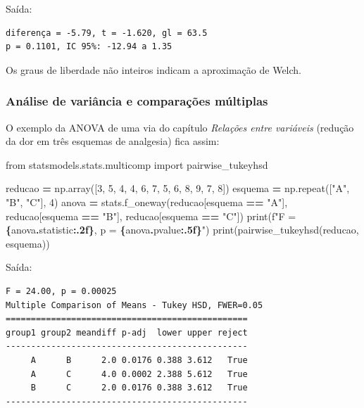 \documentclass[
]{book}
\newenvironment{Shaded}{\begin{snugshade}}{\end{snugshade}}
\newcommand{\BuiltInTok}[1]{#1}
\newcommand{\DecValTok}[1]{\textcolor[rgb]{0.00,0.00,0.81}{#1}}
\newcommand{\ImportTok}[1]{#1}
\newcommand{\NormalTok}[1]{#1}
\newcommand{\OperatorTok}[1]{\textcolor[rgb]{0.81,0.36,0.00}{\textbf{#1}}}
\newcommand{\SpecialCharTok}[1]{\textcolor[rgb]{0.81,0.36,0.00}{\textbf{#1}}}
\newcommand{\SpecialStringTok}[1]{\textcolor[rgb]{0.31,0.60,0.02}{#1}}
\newcommand{\StringTok}[1]{\textcolor[rgb]{0.31,0.60,0.02}{#1}}
\begin{document}
Saída:

\begin{verbatim}
diferença = -5.79, t = -1.620, gl = 63.5
p = 0.1101, IC 95%: -12.94 a 1.35
\end{verbatim}

Os graus de liberdade não inteiros indicam a aproximação de Welch.

\subsubsection{Análise de variância e comparações múltiplas}\label{anuxe1lise-de-variuxe2ncia-e-comparauxe7uxf5es-muxfaltiplas}

O exemplo da ANOVA de uma via do capítulo \emph{Relações entre variáveis} (redução da dor em três esquemas de analgesia) fica assim:

\begin{Shaded}
\begin{Highlighting}[]
\ImportTok{from}\NormalTok{ statsmodels.stats.multicomp }\ImportTok{import}\NormalTok{ pairwise\_tukeyhsd}

\NormalTok{reducao }\OperatorTok{=}\NormalTok{ np.array([}\DecValTok{3}\NormalTok{, }\DecValTok{5}\NormalTok{, }\DecValTok{4}\NormalTok{, }\DecValTok{4}\NormalTok{, }\DecValTok{6}\NormalTok{, }\DecValTok{7}\NormalTok{, }\DecValTok{5}\NormalTok{, }\DecValTok{6}\NormalTok{, }\DecValTok{8}\NormalTok{, }\DecValTok{9}\NormalTok{, }\DecValTok{7}\NormalTok{, }\DecValTok{8}\NormalTok{])}
\NormalTok{esquema }\OperatorTok{=}\NormalTok{ np.repeat([}\StringTok{"A"}\NormalTok{, }\StringTok{"B"}\NormalTok{, }\StringTok{"C"}\NormalTok{], }\DecValTok{4}\NormalTok{)}
\NormalTok{anova }\OperatorTok{=}\NormalTok{ stats.f\_oneway(reducao[esquema }\OperatorTok{==} \StringTok{"A"}\NormalTok{], reducao[esquema }\OperatorTok{==} \StringTok{"B"}\NormalTok{],}
\NormalTok{                       reducao[esquema }\OperatorTok{==} \StringTok{"C"}\NormalTok{])}
\BuiltInTok{print}\NormalTok{(}\SpecialStringTok{f"F = }\SpecialCharTok{\{}\NormalTok{anova}\SpecialCharTok{.}\NormalTok{statistic}\SpecialCharTok{:.2f\}}\SpecialStringTok{, p = }\SpecialCharTok{\{}\NormalTok{anova}\SpecialCharTok{.}\NormalTok{pvalue}\SpecialCharTok{:.5f\}}\SpecialStringTok{"}\NormalTok{)}
\BuiltInTok{print}\NormalTok{(pairwise\_tukeyhsd(reducao, esquema))}
\end{Highlighting}
\end{Shaded}

Saída:

\begin{verbatim}
F = 24.00, p = 0.00025
Multiple Comparison of Means - Tukey HSD, FWER=0.05
================================================
group1 group2 meandiff p-adj  lower upper reject
------------------------------------------------
     A      B      2.0 0.0176 0.388 3.612   True
     A      C      4.0 0.0002 2.388 5.612   True
     B      C      2.0 0.0176 0.388 3.612   True
------------------------------------------------
\end{verbatim}
\end{document}

